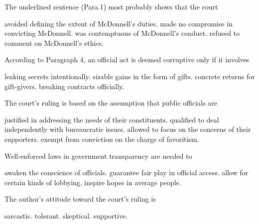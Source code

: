 \item The underlined sentence (Para.1) most probably shows that the court
\begin{tasks}
	\task avoided defining the extent of McDonnell's duties.
	\task made no compromise in convicting McDonnell.
	\task was contemptuous of McDonnell's conduct.
	\task refused to comment on McDonnell's ethics.
\end{tasks}
\item According to Paragraph 4, an official act is deemed corruptive only if it involves
\begin{tasks}
	\task leaking secrets intentionally.
	\task sizable gains in the form of gifts.
	\task concrete returns for gift-givers.
	\task breaking contracts officially.
\end{tasks}
\item The court's ruling is based on the assumption that public officials are
\begin{tasks}
	\task justified in addressing the needs of their constituents.
	\task qualified to deal independently with bureaucratic issues.
	\task allowed to focus on the concerns of their supporters.
	\task exempt from conviction on the charge of favoritism.
\end{tasks}
\item Well-enforced laws in government transparency are needed to
\begin{tasks}
	\task awaken the conscience of officials.
	\task guarantee fair play in official access.
	\task allow for certain kinds of lobbying.
	\task inspire hopes in average people.
\end{tasks}
\item The author's attitude toward the court's ruling is
\begin{tasks}
	\task sarcastic.
	\task tolerant.
	\task skeptical.
	\task supportive.
\end{tasks}